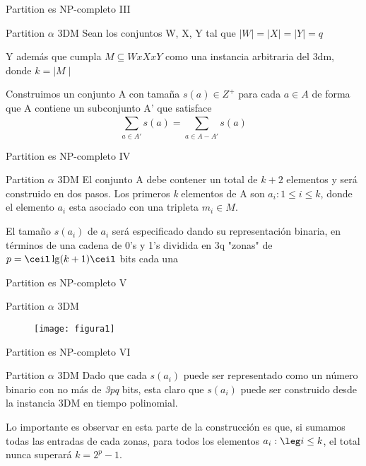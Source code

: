 \documentclass[10pt, mathserif, profesionalfont]{beamer}
\begin{document}
\begin{frame}{Partition es NP-completo III}

\begin{block}{Partition $\alpha$ 3DM}    
Sean los conjuntos W, X, Y tal que \(\mid W\mid = \mid X\mid = \mid Y\mid = q\) 
\end{block}

\begin{block}{}
Y además que cumpla \(M\subseteq W x X x Y\) como una instancia arbitraria del \gls{3dm}, donde \(k = \mid M\mid\) 
\end{block}

\begin{block}{}
Construimos un conjunto A con tamaña $s(a)\in Z^+$ para cada $a\in A$ de forma que A contiene un subconjunto A' que satisface
\[\sum_{a \in A'}^{} s(a) = \sum_{a \in A-A'}^{} s(a)\]
\end{block}


\end{frame}

\begin{frame}{Partition es NP-completo IV}
    
\begin{block}{Partition $\alpha$ 3DM}    
El conjunto A debe contener un total de $k+2$ elementos y será construido en dos pasos.
Los primeros \textit{k} elementos de A son ${a_i:1\leq i\leq k}$, donde el elemento $a_i$ esta asociado con una tripleta $m_i\in M$.
\end{block}
\begin{block}{}
El tamaño $s(a_i)$ de $a_i$ será especificado dando su representación binaria, en términos de una cadena de 0's y 1's dividida en 3q "zonas" de \(p= \ceil \lg (k+1) \ceil\) bits cada una
\end{block}
\end{frame}

\begin{frame}{Partition es NP-completo V}
    
\begin{block}{Partition $\alpha$ 3DM}    
\begin{figure}[H]
    \centering
    \texttt{[image: figura1]}
\end{figure}

\end{block}

\end{frame}


\begin{frame}{Partition es NP-completo VI}
\begin{block}{Partition $\alpha$ 3DM}    
Dado que cada $s(a_i)$ puede ser representado como un número binario con no más de \textit{3pq} bits, esta claro que $s(a_i)$ puede ser construido desde la instancia 3DM en tiempo polinomial. 
\end{block}
\begin{block}{}
Lo importante es observar en esta parte de la construcción es que, si sumamos todas las entradas de cada zonas, para todos los elementos \({a_i:\leg i\leq k}\), el total nunca superará \(k=2^p-1\). 
\end{block}
\end{frame}
\end{document}
